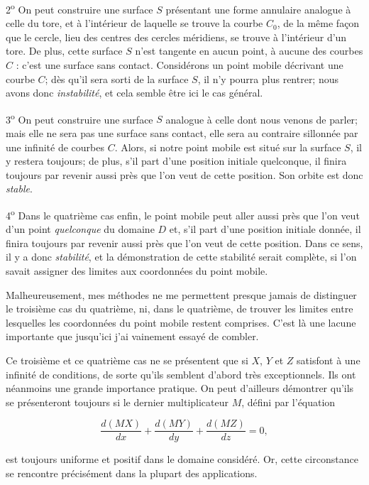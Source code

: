 \documentclass[11pt]{article}
\begin{document}
2\textsuperscript{o} On peut construire une surface $S$ présentant une forme annulaire analogue à celle du tore, et à l’intérieur de laquelle se trouve la courbe $C_0$, de la même façon que le cercle, lieu des centres des cercles méridiens, se trouve à l’intérieur d’un tore. De plus, cette surface $S$ n’est tangente en aucun point, à aucune des courbes $C$ : c’est une surface sans contact. Considérons un point mobile décrivant une courbe $C$; dès qu’il sera sorti de la surface $S$, il n’y pourra plus rentrer; nous avons donc \emph{instabilité}, et cela semble être ici le cas général.

3\textsuperscript{o} On peut construire une surface $S$ analogue à celle dont nous venons de parler; mais elle ne sera pas une surface sans contact, elle sera au contraire sillonnée par une infinité de courbes $C$. Alors, si notre point mobile est situé sur la surface $S$, il y restera toujours; de plus, s’il part d’une position initiale quelconque, il finira toujours par revenir aussi près que l’on veut de cette position. Son orbite est donc \emph{stable}.

4\textsuperscript{o} Dans le quatrième cas enfin, le point mobile peut aller aussi près que l’on veut d’un point \emph{quelconque} du domaine $D$ et, s’il part d’une position initiale donnée, il finira toujours par revenir aussi près que l’on veut de cette position. Dans ce sens, il y a donc \emph{stabilité}, et la démonstration de cette stabilité serait complète, si l’on savait assigner des limites aux coordonnées du point mobile.

Malheureusement, mes méthodes ne me permettent presque jamais de distinguer le troisième cas du quatrième, ni, dans le quatrième, de trouver les limites entre lesquelles les coordonnées du point mobile restent comprises. C’est là une lacune importante que jusqu’ici j’ai vainement essayé de combler.

Ce troisième et ce quatrième cas ne se présentent que si $X$, $Y$ et $Z$ satisfont à une infinité de conditions, de sorte qu’ils semblent d’abord très exceptionnels. Ils ont néanmoins une grande importance pratique. On peut d’ailleurs démontrer qu’ils se présenteront toujours si le dernier multiplicateur $M$, défini par l’équation

\[
\frac{d(MX)}{dx}+\frac{d(MY)}{dy}+\frac{d(MZ)}{dz}=0,
\]

est toujours uniforme et positif dans le domaine considéré. Or, cette circonstance se rencontre précisément dans la plupart des applications.
\end{document}
